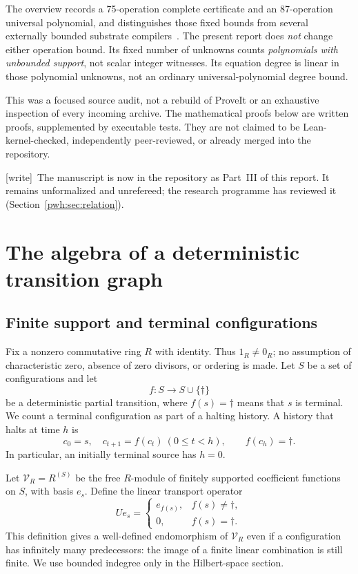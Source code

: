 \documentclass[11pt,letterpaper]{article}
\numberwithin{equation}{section}
\theoremstyle{definition}
\newcommand{\V}{\mathcal V}
\newcommand{\wtag}{\textup{[write]}}
\begin{document}
The overview records a 75-operation complete certificate and an
87-operation universal polynomial, and distinguishes those fixed bounds
from several externally bounded substrate compilers~\cite{bt:repo-h10}.
The present report does \emph{not} change either operation bound. Its
fixed number of unknowns counts \emph{polynomials with unbounded support},
not scalar integer witnesses. Its equation degree is linear in those
polynomial unknowns, not an ordinary universal-polynomial degree bound.

This was a focused source audit, not a rebuild of ProveIt or an exhaustive
inspection of every incoming archive. The mathematical proofs below are
written proofs, supplemented by executable tests. They are not claimed
to be Lean-kernel-checked, independently peer-reviewed, or already merged
into the repository.

\wtag\ The manuscript is now in the repository as Part~III of this report.
It remains unformalized and unrefereed; the research programme has
reviewed it~\cite{reviewBS} (Section~\ref{pwh:sec:relation}).

\section{The algebra of a deterministic transition graph}\label{pwh:bt:sec:graph}

\subsection{Finite support and terminal configurations}
Fix a nonzero commutative ring $R$ with identity. Thus $1_R\ne0_R$; no
assumption of characteristic zero, absence of zero divisors, or ordering
is made. Let $S$ be a set of configurations and let
\[
 f:S\longrightarrow S\cup\{\dagger\}
\]
be a deterministic partial transition, where $f(s)=\dagger$ means that
$s$ is terminal. We count a terminal configuration as part of a halting
history. A history that halts at time $h$ is
\[
 c_0=s,\quad c_{t+1}=f(c_t)\ (0\le t<h),\qquad f(c_h)=\dagger.
\]
In particular, an initially terminal source has $h=0$.

Let $\V_R=R^{(S)}$ be the free $R$-module of finitely supported coefficient
functions on $S$, with basis $e_s$. Define the linear transport operator
\begin{equation}\label{pwh:bt:eq:U}
 Ue_s=\begin{cases}e_{f(s)},&f(s)\ne\dagger,\\0,&f(s)=\dagger.\end{cases}
\end{equation}
This definition gives a well-defined endomorphism of $\V_R$ even if a
configuration has infinitely many predecessors: the image of a finite
linear combination is still finite. We use bounded indegree only in the
Hilbert-space section.
\end{document}
